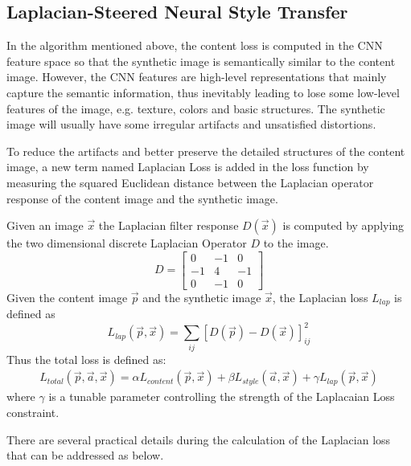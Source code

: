 \documentclass[runningheads]{llncs}
\begin{document}
\subsection{Laplacian-Steered Neural Style Transfer}
In the algorithm mentioned above, the content loss is computed in the CNN feature space so that the synthetic image is semantically similar to the content image. However, the CNN features are high-level representations that mainly capture the semantic information, thus inevitably leading to lose some low-level features of the image, e.g. texture, colors and basic structures. 
The synthetic image will usually have some irregular artifacts and unsatisfied distortions\cite{jing2017neural}. 

To reduce the artifacts and better preserve the detailed structures of the content image, a new term named Laplacian Loss is added in the loss function\cite{LiShaohua2017LNST} by measuring the squared Euclidean distance between the Laplacian operator response of the content image and the synthetic image. 

Given an image $\vec{x}$ the Laplacian filter response $D(\vec{x})$ is computed by applying the two dimensional discrete Laplacian Operator $D$ to the image.
\begin{equation}
    D=\begin{bmatrix}
0 & -1 & 0\\ 
-1 & 4 & -1\\ 
0 & -1 & 0
\end{bmatrix}
\end{equation}
Given the content image $\vec{p}$ and the synthetic image $\vec{x}$, the Laplacian loss $L_{lap}$ is defined as 
\begin{equation}
    L_{lap}(\vec{p},\vec{x}) = \sum_{ij}[D(\vec{p})-D(\vec{x})]_{ij}^2
\end{equation}
Thus the total loss is defined as:
\begin{align}
    L_{total}(\vec{p},\vec{a},\vec{x})=\alpha L_{content}(\vec{p},\vec{x})+\beta L_{style}(\vec{a},\vec{x})+\gamma L_{lap}(\vec{p},\vec{x})
\end{align}
where $\gamma$ is a tunable parameter controlling the strength of the Laplacaian Loss constraint.

There are several practical details during the calculation of the Laplacian loss\cite{LiShaohua2017LNST} that can be addressed as below.

\end{document}
